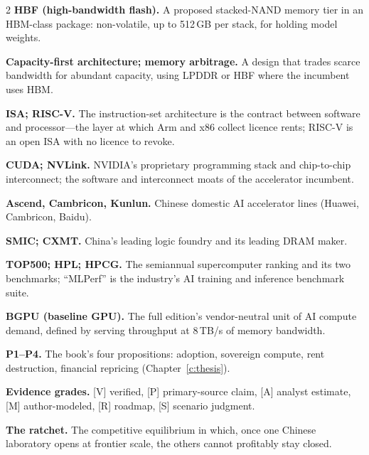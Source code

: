 \begin{multicols}{2}
\textbf{HBF (high-bandwidth flash).} A proposed stacked-NAND memory tier in an HBM-class package: non-volatile, up to 512\,GB per stack, for holding model weights.\par
\textbf{Capacity-first architecture; memory arbitrage.} A design that trades scarce bandwidth for abundant capacity, using LPDDR or HBF where the incumbent uses HBM.\par
\textbf{ISA; RISC-V.} The instruction-set architecture is the contract between software and processor---the layer at which Arm and x86 collect licence rents; RISC-V is an open ISA with no licence to revoke.\par
\textbf{CUDA; NVLink.} NVIDIA's proprietary programming stack and chip-to-chip interconnect; the software and interconnect moats of the accelerator incumbent.\par
\textbf{Ascend, Cambricon, Kunlun.} Chinese domestic AI accelerator lines (Huawei, Cambricon, Baidu).\par
\textbf{SMIC; CXMT.} China's leading logic foundry and its leading DRAM maker.\par
\textbf{TOP500; HPL; HPCG.} The semiannual supercomputer ranking and its two benchmarks; ``MLPerf'' is the industry's AI training and inference benchmark suite.\par
\textbf{BGPU (baseline GPU).} The full edition's vendor-neutral unit of AI compute demand, defined by serving throughput at 8\,TB/s of memory bandwidth.\par
\textbf{P1--P4.} The book's four propositions: adoption, sovereign compute, rent destruction, financial repricing (Chapter~\ref{c:thesis}).\par
\textbf{Evidence grades.} [V] verified, [P] primary-source claim, [A] analyst estimate, [M] author-modeled, [R] roadmap, [S] scenario judgment.\par
\textbf{The ratchet.} The competitive equilibrium in which, once one Chinese laboratory opens at frontier scale, the others cannot profitably stay closed.\par
\end{multicols}

